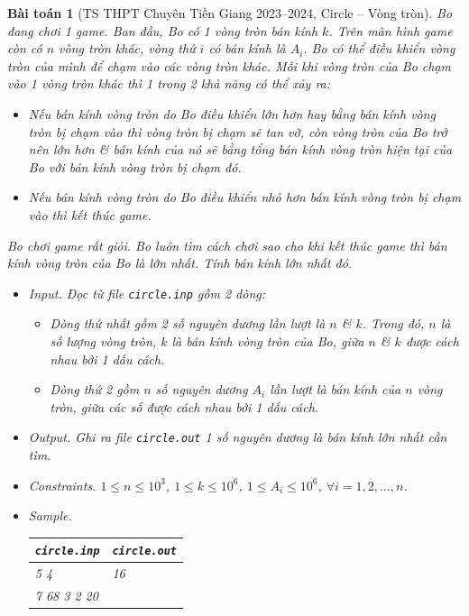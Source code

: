 \documentclass{article}
\newtheorem{baitoan}{Bài toán}
\begin{document}
\begin{baitoan}[TS THPT Chuyên Tiền Giang 2023--2024, Circle -- Vòng tròn]
	Bo đang chơi 1 game. Ban đầu, Bo có 1 vòng tròn bán kính $k$. Trên màn hình game còn có $n$ vòng tròn khác, vòng thứ $i$ có bán kính là $A_i$. Bo có thể điều khiển vòng tròn của mình để chạm vào các vòng tròn khác. Mỗi khi vòng tròn của Bo chạm vào 1 vòng tròn khác thì 1 trong 2 khả năng có thể xảy ra:
	\begin{itemize}
		\item Nếu bán kính vòng tròn do Bo điều khiển lớn hơn hay bằng bán kính vòng tròn bị chạm vào thì vòng tròn bị chạm sẽ tan vỡ, còn vòng tròn của Bo trở nên lớn hơn \& bán kính của nó sẽ bằng tổng bán kính vòng tròn hiện tại của Bo với bán kính vòng tròn bị chạm đó.
		\item Nếu bán kính vòng tròn do Bo điều khiển nhỏ hơn bán kính vòng tròn bị chạm vào thì kết thúc game.
	\end{itemize}
	Bo chơi game rất giỏi. Bo luôn tìm cách chơi sao cho khi kết thúc game thì bán kính vòng tròn của Bo là lớn nhất. Tính bán kính lớn nhất đó.
	\begin{itemize}
		\item {\sf Input.} Đọc từ file \verb|circle.inp| gồm 2 dòng:
		\begin{itemize}
			\item Dòng thứ nhất gồm 2 số nguyên dương lần lượt là $n$ \& $k$. Trong đó, $n$ là số lượng vòng tròn, $k$ là bán kính vòng tròn của Bo, giữa $n$ \& $k$ được cách nhau bởi 1 dấu cách.
			\item Dòng thứ 2 gồm $n$ số nguyên dương $A_i$ lần lượt là bán kính của $n$ vòng tròn, giữa các số được cách nhau bởi 1 dấu cách.
		\end{itemize}
		\item {\sf Output.} Ghi ra file \verb|circle.out| 1 số nguyên dương là bán kính lớn nhất cần tìm.
		\item {\sf Constraints.} $1\le n\le10^3$, $1\le k\le10^6$, $1\le A_i\le10^6$, $\forall i = 1,2,\ldots,n$.
		\item {\sf Sample.}
		\begin{table}[H]
			\centering
			\begin{tabular}{|l|l|}
				\hline
				{\tt circle.inp} & {\tt circle.out} \\
				\hline
				5 4 & 16 \\
				\hline
				7 68 3 2 20 & \\
				\hline
			\end{tabular}
		\end{table}

\end{itemize}
\end{baitoan}
\end{document}

